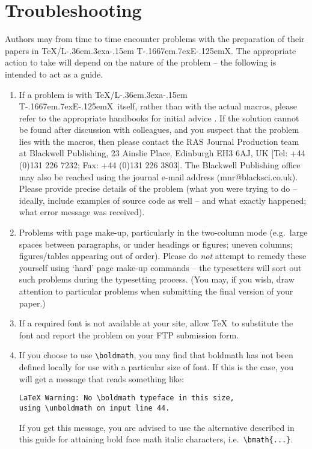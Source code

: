 \documentclass[useAMS,usenatbib]{mn2e}
\def\LaTeX{L\kern-.36em\raise.3ex\hbox{a}\kern-.15em
    T\kern-.1667em\lower.7ex\hbox{E}\kern-.125emX}
\begin{document}
\section{Troubleshooting}

Authors may from time to time encounter problems with the  preparation
of their papers in \TeX/\LaTeX. The appropriate  action  to
take will depend on the nature of the problem -- the following is
intended to act as a guide.
%
\begin{enumerate}
\item If a problem is with \TeX/\LaTeX\ itself, rather than with the
actual macros, please refer to the appropriate handbooks for
initial advice \citep{kd,kn}. If the solution cannot be found
after discussion with colleagues, and you suspect that the problem
lies with the macros, then please contact the RAS Journal
Production team at Blackwell Publishing, 23 Ainslie Place,
Edinburgh EH3 6AJ, UK [Tel: +44 (0)131 226 7232; Fax: +44 (0)131
226 3803]. The Blackwell Publishing office may also be reached
using the journal e-mail address (mnr@blacksci.co.uk). Please
provide precise details of the problem (what you were trying to do
-- ideally, include examples of source code as well -- and what
exactly happened; what error message was received).

\item Problems with page make-up, particularly in the two-column
mode (e.g.\ large spaces between paragraphs, or under headings or figures;
uneven columns; figures/tables appearing out of order). Please do {\it
not\/} attempt to remedy these yourself using `hard' page make-up commands
-- the typesetters will sort out such problems during the typesetting
process. (You may, if you wish, draw attention to particular problems when
submitting the final version of your paper.)

\item If a required font is not available at your site, allow \TeX\
to substitute the font and report the problem on your FTP submission form.

\item If you choose to use \verb"\boldmath", you may find that boldmath has
not been defined locally for use with a particular size of font. If this is
the case, you will get a message that reads something like:
%
\begin{verbatim}
LaTeX Warning: No \boldmath typeface in this size,
using \unboldmath on input line 44.
\end{verbatim}

If you get this message, you are advised to use the alternative described
in this guide for attaining bold face math italic characters,
i.e.\ \verb"\bmath{...}".
\end{enumerate}
\end{document}
